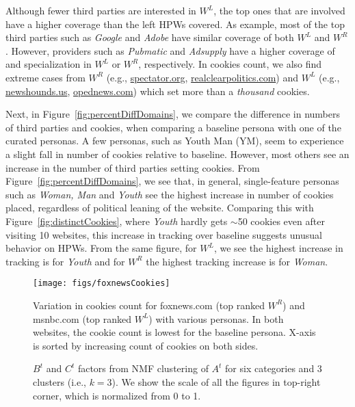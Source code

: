 \documentclass{article}
\newcommand{\hpws}{HPWs\xspace}
\begin{document}
Although fewer third parties are interested in $W^L$, the top ones that are involved have a higher coverage than the left \hpws covered.
As example, most of the top third parties such as \emph{Google} and \emph{Adobe} have similar coverage of both $W^L$ and $W^R$.
However, providers such as \emph{Pubmatic} and \emph{Adsupply} have a higher coverage of and specialization in $W^L$ or $W^R$, respectively.
In cookies count, we also find extreme cases from
$W^R$ (e.g., \url{spectator.org}, \url{realclearpolitics.com}) and
$W^L$ (e.g., \url{newshounds.us}, \url{opednews.com}) which set more than a \emph{thousand} cookies.

Next, in Figure~\ref{fig:percentDiffDomains}, we compare the difference in numbers of third parties and cookies, when comparing a baseline persona with one of the curated personas.
A few personas, such as Youth Man (YM), seem to experience a slight fall in number of cookies relative to baseline.
However, most others see an increase in the number of third parties setting cookies.
From Figure~\ref{fig:percentDiffDomains}, we see that, in general, single-feature personas such as \emph{Woman, Man} and \emph{Youth}  see the highest increase in number of cookies placed, regardless of political leaning of the website.
Comparing this with Figure~\ref{fig:distinctCookies}, where \emph{Youth} hardly gets $\sim$50 cookies even after visiting 10 websites, this increase in tracking over baseline suggests unusual behavior on \hpws.
From the same figure, for $W^L$, we see the highest increase in tracking is for \emph{Youth} and for $W^R$ the highest tracking increase is for \emph{Woman}.


\begin{figure}[t]
    \centering
    \texttt{[image: figs/foxnewsCookies]}
    \caption{Variation in cookies count for foxnews.com (top ranked $W^R$) and msnbc.com (top ranked $W^L$) with various personas.
        In both websites, the cookie count is lowest for the baseline persona. X-axis is sorted by increasing count of cookies on both sides.}%
    \label{fig:foxnews}
\end{figure}

\begin{figure*}[t]
    \centering
    \caption{$B^t$ and $C^t$ factors from NMF clustering of $A^t$ for six categories and 3 clusters (i.e., $k=3$). We show the scale of all the figures in top-right corner, which is normalized from 0 to 1.}
    \label{fig:nmfW}
\end{figure*}
\end{document}
